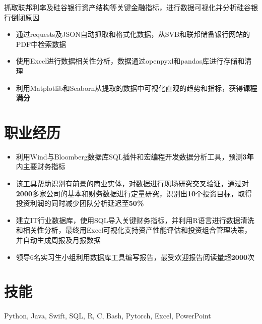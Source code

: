 \documentclass{resume}
\begin{document}
\smallskip
{}
抓取联邦利率及硅谷银行资产结构等关键金融指标，进行数据可视化并分析硅谷银行倒闭原因
\begin{itemize}
  \item 通过requests及JSON自动抓取和格式化数据，从SVB和联邦储备银行网站的PDF中检索数据
  \item 使用Excel进行数据相关性分析，数据通过openpyxl和pandas库进行存储和清理
  \item 利用Matplotlib和Seaborn从提取的数据中可视化直观的趋势和指标，获得\textbf{课程满分}
\end{itemize}

\section{职业经历}

\begin{itemize}
  \item 利用Wind与Bloomberg数据库SQL插件和宏编程开发数据分析工具，预测\textbf{3年}内主要财务指标
  \item 该工具帮助识别有前景的商业实体，对数据进行现场研究交叉验证，通过对\textbf{2000}多家公司的基本和财务数据进行定量研究，识别出\textbf{10}个投资目标，取得投资利润的同时减少团队分析延迟至\textbf{50\%}
\end{itemize}

\smallskip
{}
\begin{itemize}
  \item 建立IT行业数据库，使用SQL导入关键财务指标，并利用R语言进行数据清洗和相关性分析，最终用Excel可视化支持资产性能评估和投资组合管理决策，并自动生成周报及月报数据
  \item 领导6名实习生小组利用数据库工具编写报告，最受欢迎报告阅读量超\textbf{2000}次
\end{itemize}

\smallskip
\section{技能}
Python, Java, Swift, SQL, R, C, Bash, Pytorch, Excel, PowerPoint
\end{document}
